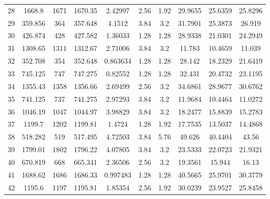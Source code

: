 \begin{table}
\begin{tabular}{cccccccccc}
      28   &  1668.8   &      1671       &  1670.35  & 2.42997  &      2.56      &   1.92   &  29.9655   &     25.6359      &  25.8296   \\
      29   &  359.856  &       364       &  357.648  &  4.1512  &      3.84      &   3.2    &  31.7901   &     25.3873      &   26.919   \\
      30   &  426.874  &       428       &  427.582  & 1.36033  &      1.28      &   1.28   &  28.9338   &     21.0301      &  24.2949   \\
      31   &  1308.65  &      1311       &  1312.67  & 2.71006  &      3.84      &   3.2    &   11.783   &     10.4659      &   11.039   \\
      32   &  352.708  &       354       &  352.648  & 0.863634 &      1.28      &   1.28   &   28.142   &     18.2329      &  21.6419   \\
      33   &  745.125  &       747       &  747.275  & 0.82552  &      1.28      &   1.28   &   32.431   &     20.4732      &  23.1195   \\
      34   &  1355.43  &      1358       &  1356.66  & 2.69499  &      2.56      &   3.2    &  34.6861   &     28.9677      &  30.6762   \\
      35   &  741.125  &       737       &  741.275  & 2.97293  &      3.84      &   3.2    &  11.9684   &     10.4464      &  11.0272   \\
      36   &  1046.19  &      1047       &  1044.97  & 3.98829  &      3.84      &   3.2    &  18.2477   &     15.8839      &  15.2783   \\
      37   &  1199.7   &      1202       &  1199.81  &  1.4724  &      1.28      &   1.92   &  17.7535   &     13.5037      &  14.4868   \\
      38   &  518.282  &       519       &  517.495  & 4.72503  &      3.84      &   5.76   &   49.626   &     40.4404      &   43.56    \\
      39   &  1799.01  &      1802       &  1796.22  & 4.07805  &      3.84      &   3.2    &  23.5333   &     22.0723      &  21.9321   \\
      40   &  670.819  &       668       &  665.341  & 2.36506  &      2.56      &   3.2    &  19.3561   &      15.944      &   16.13    \\
      41   &  1688.62  &      1686       &  1686.33  & 0.997483 &      1.28      &   1.28   &  40.5665   &     25.9701      &  30.3779   \\
      42   &  1195.6   &      1197       &  1195.81  & 1.85354  &      2.56      &   1.92   &  30.0239   &     23.9527      &  25.8458   \\

\end{tabular}
\end{table}
